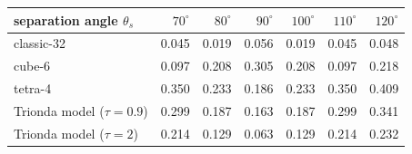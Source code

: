 \begin{tabular}{@{}lrrrrrr@{}}
\toprule
separation angle $\theta_s$ & $70^\circ$ & $80^\circ$ & $90^\circ$ & $100^\circ$ & $110^\circ$ & $120^\circ$ \\
\midrule
classic-32 & 0.045 & 0.019 & 0.056 & 0.019 & 0.045 & 0.048 \\
cube-6 & 0.097 & 0.208 & 0.305 & 0.208 & 0.097 & 0.218 \\
tetra-4 & 0.350 & 0.233 & 0.186 & 0.233 & 0.350 & 0.409 \\
Trionda model ($\tau=0.9$) & 0.299 & 0.187 & 0.163 & 0.187 & 0.299 & 0.341 \\
Trionda model ($\tau=2$) & 0.214 & 0.129 & 0.063 & 0.129 & 0.214 & 0.232 \\
\bottomrule
\end{tabular}
